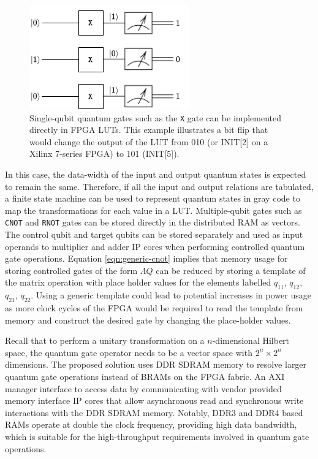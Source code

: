 \begin{figure}[!ht]
	\centering
	\includegraphics[width=0.85\linewidth]{body/ch4/figs/3-x-gates}
	\caption[Illustrating a Simple Bit Flip Using 3 \texttt{X} gates.]{Single-qubit quantum gates such as the \texttt{X} gate can be implemented directly in FPGA LUTs. This example illustrates a bit flip that would change the output of the LUT from 010 (or INIT[2] on a Xilinx 7-series FPGA) to 101 (INIT[5]).}
	\label{fig:3-x-gates}
\end{figure}

In this case, the data-width of the input and output quantum states is expected to remain the same. Therefore, if all the input and output relations are tabulated, a finite state machine can be used to represent quantum states in gray code to map the transformations for each value in a LUT. Multiple-qubit gates such as \texttt{CNOT} and \texttt{RNOT} gates can be stored directly in the distributed RAM as vectors. The control qubit and target qubits can be stored separately and used as input operands to multiplier and adder IP cores when performing controlled quantum gate operations. Equation \ref{eqn:generic-cnot} implies that memory usage for storing controlled gates of the form $\Lambda Q$ can be reduced by storing a template of the matrix operation with place holder values for the elements labelled $q_{11}$, $q_{12}$, $q_{21}$, $q_{22}$. Using a generic template could lead to potential increases in power usage as more clock cycles of the FPGA would be required to read the template from memory and construct the desired gate by changing the place-holder values.

Recall that to perform a unitary transformation on a $n$-dimensional Hilbert space, the quantum gate operator needs to be a vector space with $2^n \times 2^n$ dimensions. The proposed solution uses DDR SDRAM memory to resolve larger quantum gate operations instead of BRAMs on the FPGA fabric. An AXI manager interface to access data by communicating with vendor provided memory interface IP cores that allow asynchronous read and synchronous write interactions with the DDR SDRAM memory. Notably, DDR3 and DDR4 based RAMs operate at double the clock frequency, providing high data bandwidth, which is suitable for the high-throughput requirements involved in quantum gate operations. 

